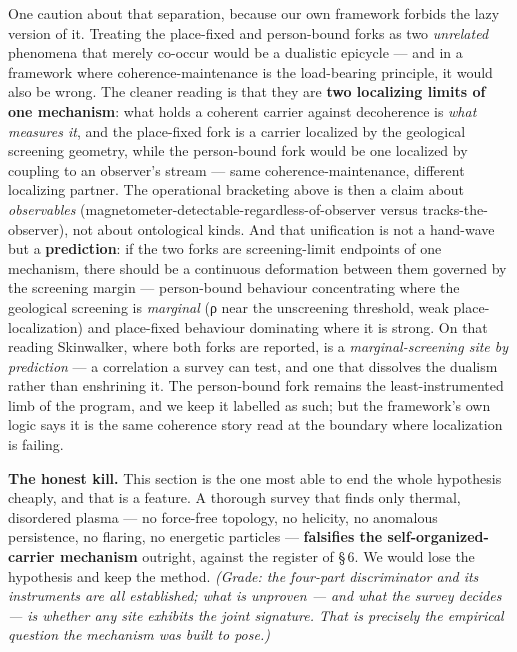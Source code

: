 \documentclass[11pt]{article}
\begin{document}
One caution about that separation, because our own framework forbids the lazy version of it. Treating the place-fixed and person-bound forks as two \emph{unrelated} phenomena that merely co-occur would be a dualistic epicycle --- and in a framework where coherence-maintenance is the load-bearing principle, it would also be wrong. The cleaner reading is that they are \textbf{two localizing limits of one mechanism}: what holds a coherent carrier against decoherence is \emph{what measures it}, and the place-fixed fork is a carrier localized by the geological screening geometry, while the person-bound fork would be one localized by coupling to an observer's stream --- same coherence-maintenance, different localizing partner. The operational bracketing above is then a claim about \emph{observables} (magnetometer-detectable-regardless-of-observer versus tracks-the-observer), not about ontological kinds. And that unification is not a hand-wave but a \textbf{prediction}: if the two forks are screening-limit endpoints of one mechanism, there should be a continuous deformation between them governed by the screening margin --- person-bound behaviour concentrating where the geological screening is \emph{marginal} (ρ near the unscreening threshold, weak place-localization) and place-fixed behaviour dominating where it is strong. On that reading Skinwalker, where both forks are reported, is a \emph{marginal-screening site by prediction} --- a correlation a survey can test, and one that dissolves the dualism rather than enshrining it. The person-bound fork remains the least-instrumented limb of the program, and we keep it labelled as such; but the framework's own logic says it is the same coherence story read at the boundary where localization is failing.

\textbf{The honest kill.} This section is the one most able to end the whole hypothesis cheaply, and that is a feature. A thorough survey that finds only thermal, disordered plasma --- no force-free topology, no helicity, no anomalous persistence, no flaring, no energetic particles --- \textbf{falsifies the self-organized-carrier mechanism} outright, against the register of \S\,6. We would lose the hypothesis and keep the method. \emph{(Grade: the four-part discriminator and its instruments are all established; what is unproven --- and what the survey decides --- is whether any site exhibits the joint signature. That is precisely the empirical question the mechanism was built to pose.)}
\end{document}

